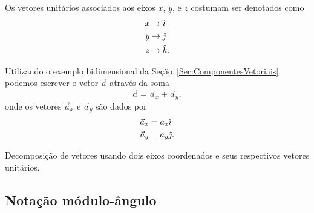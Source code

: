 Os vetores unitários associados aos eixos $x$, $y$, e $z$ costumam ser denotados como
\begin{align}
  x &\to \hat{\imath} \\
  y &\to \hat{\jmath} \\
  z &\to \hat{k}.
\end{align}

Utilizando o exemplo bidimensional da Seção~\ref{Sec:ComponentesVetoriais}, podemos escrever o vetor $\vec{a}$ através da soma
\begin{equation}
  \vec{a} = \vec{a}_x + \vec{a}_y,
\end{equation}
%
onde os vetores $\vec{a}_x$ e $\vec{a}_y$ são dados por
\begin{align}
  \vec{a}_x &= a_x \hat{\imath} \\
  \vec{a}_y &= a_y \hat{\jmath}.
\end{align}

\begin{marginfigure}
\centering
{}
\caption{Decomposição de vetores usando dois eixos coordenados e seus respectivos vetores unitários.\label{Fig:sis_ref_orto_vers}}
\end{marginfigure}


\subsection{Notação módulo-ângulo}

